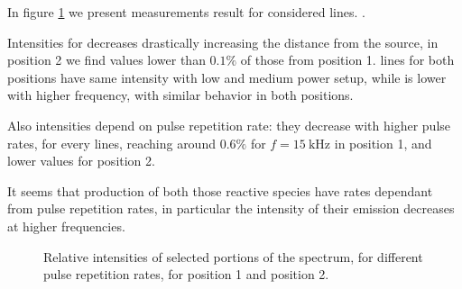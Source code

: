 In figure \ref{fig:irel} we present measurements result for considered lines. .

Intensities for  decreases drastically increasing the distance from the source, in position 2 we find values lower than $0.1\%$ of those from position 1.  lines for both positions have same intensity with low and medium power setup, while is lower with higher frequency, with similar behavior in both positions.

Also  intensities depend on pulse repetition rate: they decrease with higher pulse rates, for every lines, reaching around $0.6\%$ for $f = \SI{15}{\kilo\hertz}$ in position 1, and lower values for position 2.

It seems that production of both those reactive species have rates dependant from pulse repetition rates, in particular the intensity of their emission decreases at higher frequencies.
\begin{figure}
\centering
 \hspace{0.55\textwidth}
 \hfill
 \caption{Relative intensities of selected portions of the spectrum, for different pulse repetition rates, for position 1 and position 2.}
 \label{fig:irel}
\end{figure}


